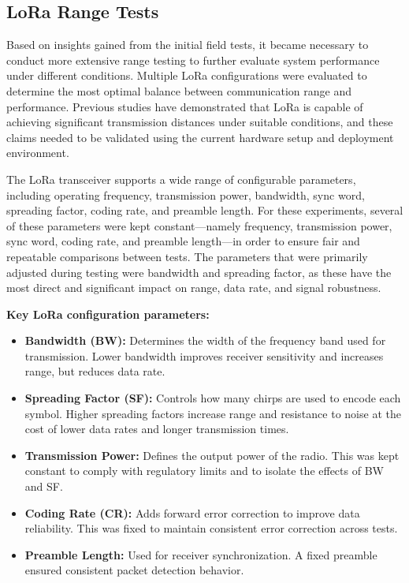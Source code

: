 \subsection{LoRa Range Tests}

Based on insights gained from the initial field tests, it became
necessary to conduct more extensive range testing to further evaluate
system performance under different conditions. Multiple LoRa
configurations were evaluated to determine the most optimal balance
between communication range and performance. Previous studies have
demonstrated that LoRa is capable of achieving significant transmission
distances under suitable conditions, and these claims needed to be
validated using the current hardware setup and deployment environment.

The LoRa transceiver supports a wide range of configurable parameters,
including operating frequency, transmission power, bandwidth, sync word,
spreading factor, coding rate, and preamble length. For these
experiments, several of these parameters were kept constant---namely
frequency, transmission power, sync word, coding rate, and preamble
length---in order to ensure fair and repeatable comparisons between
tests. The parameters that were primarily adjusted during testing were
bandwidth and spreading factor, as these have the most direct and
significant impact on range, data rate, and signal robustness.

\textbf{Key LoRa configuration parameters:}

\begin{itemize}
\item
  \textbf{Bandwidth (BW):} Determines the width of the frequency band
  used for transmission. Lower bandwidth improves receiver sensitivity
  and increases range, but reduces data rate.
\item
  \textbf{Spreading Factor (SF):} Controls how many chirps are used to
  encode each symbol. Higher spreading factors increase range and
  resistance to noise at the cost of lower data rates and longer
  transmission times.
\item
  \textbf{Transmission Power:} Defines the output power of the radio.
  This was kept constant to comply with regulatory limits and to isolate
  the effects of BW and SF.
\item
  \textbf{Coding Rate (CR):} Adds forward error correction to improve
  data reliability. This was fixed to maintain consistent error
  correction across tests.
\item
  \textbf{Preamble Length:} Used for receiver synchronization. A fixed
  preamble ensured consistent packet detection behavior.
\end{itemize}

